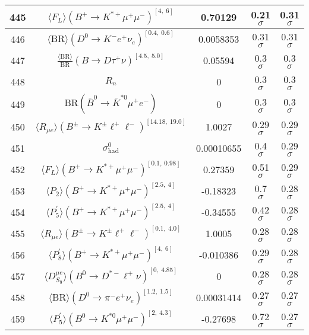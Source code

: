 \begin{longtable}{|c|c|c|c|c|}
445 &	 $\langle F_L\rangle(B^+\to K^{\ast +}\mu^+\mu^-)^{[4,\  6]}$ &	 0.70129 &	 \cellcolor{green!4}0.21 $ \sigma$ &	 0.31 $ \sigma$ \\ \hline
446 &	 $\langle\mathrm{BR}\rangle(D^0\to K^- e^+\nu_e)^{[0.4,\  0.6]}$ &	 0.0058353 &	 \cellcolor{red!0}0.31 $ \sigma$ &	 0.31 $ \sigma$ \\ \hline
447 &	 $\frac{\langle \mathrm{BR} \rangle}{\mathrm{BR}}(B\to D\tau^+\nu)^{[4.5,\  5.0]}$ &	 0.05594 &	 \cellcolor{red!0}0.3 $ \sigma$ &	 0.3 $ \sigma$ \\ \hline
448 &	 $R_n$ &	 0 &	 0.3 $ \sigma$ &	 0.3 $ \sigma$ \\ \hline
449 &	 $\mathrm{BR}(\bar B^0\to \bar K^{*0} \mu^+e^-)$ &	 0 &	 0.3 $ \sigma$ &	 0.3 $ \sigma$ \\ \hline
450 &	 $\langle R_{\mu e} \rangle(B^\pm\to K^\pm \ell^+\ell^-)^{[14.18,\  19.0]}$ &	 1.0027 &	 \cellcolor{green!0}0.29 $ \sigma$ &	 0.29 $ \sigma$ \\ \hline
451 &	 $\sigma_\mathrm{had}^0$ &	 0.00010655 &	 \cellcolor{red!5}0.4 $ \sigma$ &	 0.29 $ \sigma$ \\ \hline
452 &	 $\langle F_L\rangle(B^+\to K^{\ast +}\mu^+\mu^-)^{[0.1,\  0.98]}$ &	 0.27359 &	 \cellcolor{red!11}0.51 $ \sigma$ &	 0.29 $ \sigma$ \\ \hline
453 &	 $\langle P_2\rangle(B^+\to K^{\ast +}\mu^+\mu^-)^{[2.5,\  4]}$ &	 -0.18323 &	 \cellcolor{red!20}0.7 $ \sigma$ &	 0.28 $ \sigma$ \\ \hline
454 &	 $\langle P_5^\prime\rangle(B^+\to K^{\ast +}\mu^+\mu^-)^{[2.5,\  4]}$ &	 -0.34555 &	 \cellcolor{red!6}0.42 $ \sigma$ &	 0.28 $ \sigma$ \\ \hline
455 &	 $\langle R_{\mu e} \rangle(B^\pm\to K^\pm \ell^+\ell^-)^{[0.1,\  4.0]}$ &	 1.0005 &	 \cellcolor{red!0}0.28 $ \sigma$ &	 0.28 $ \sigma$ \\ \hline
456 &	 $\langle P_8^\prime\rangle(B^+\to K^{\ast +}\mu^+\mu^-)^{[4,\  6]}$ &	 -0.010386 &	 \cellcolor{red!0}0.29 $ \sigma$ &	 0.28 $ \sigma$ \\ \hline
457 &	 $\langle D_{S_9}^{\mu e} \rangle(B^0\to D^{\ast -}\ell^+\nu)^{[0,\  4.85]}$ &	 0 &	 0.28 $ \sigma$ &	 0.28 $ \sigma$ \\ \hline
458 &	 $\langle\mathrm{BR}\rangle(D^0\to \pi^- e^+\nu_e)^{[1.2,\  1.5]}$ &	 0.00031414 &	 \cellcolor{red!0}0.27 $ \sigma$ &	 0.27 $ \sigma$ \\ \hline
459 &	 $\langle P_5^\prime\rangle(B^0\to K^{\ast 0}\mu^+\mu^-)^{[2,\  4.3]}$ &	 -0.27698 &	 \cellcolor{red!22}0.72 $ \sigma$ &	 0.27 $ \sigma$ \\ \hline

\end{longtable}
